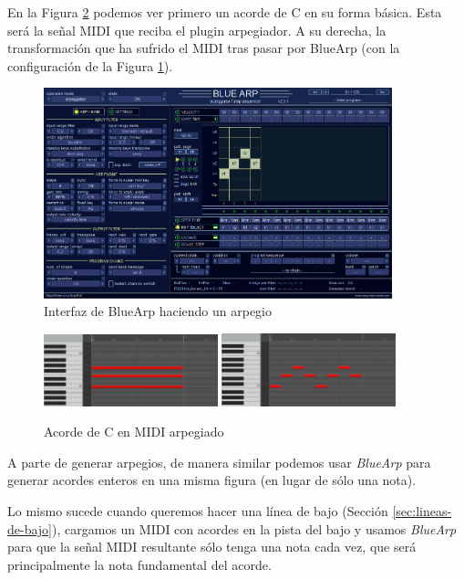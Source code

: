 En la Figura \ref{fig:CArpegiadoenMIDI} podemos ver primero un acorde de C en su forma básica. Esta será la señal MIDI que reciba el plugin arpegiador. A su derecha, la transformación que ha sufrido el MIDI tras pasar por BlueArp (con la configuración de la Figura \ref{fig:BlueArp}). 

\begin{figure}[h]
    \centering
    \includegraphics[width = 0.9\textwidth]{Imagenes/Bitmap/BlueArp.png}
    \caption{Interfaz de BlueArp haciendo un arpegio}
    \label{fig:BlueArp}
\end{figure}
    
\begin{figure}[h]
    \centering
    \includegraphics[width = 0.45\textwidth]{Imagenes/Bitmap/DoMayorMidi.png}
    \includegraphics[width = 0.45\textwidth]{Imagenes/Bitmap/DoMayorMidiArpegiado.png}
    \caption{Acorde de C en MIDI arpegiado}
    \label{fig:CArpegiadoenMIDI}
\end{figure}

A parte de generar arpegios, de manera similar podemos usar \textit{BlueArp} para generar acordes enteros en una misma figura (en lugar de sólo una nota).

Lo mismo sucede cuando queremos hacer una línea de bajo (Sección \ref{sec:lineas-de-bajo}), 
cargamos un MIDI con acordes en la pista del bajo y usamos \textit{BlueArp} para que la señal MIDI resultante sólo tenga una nota cada vez, que será principalmente la nota fundamental del acorde.
    
